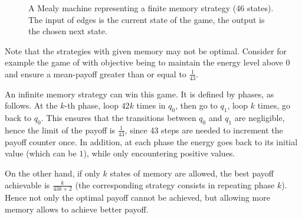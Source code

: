\begin{figure}
\centering
{}
\caption[A Mealy machine representing a finite memory strategy.]{A Mealy machine representing a finite memory strategy (46 states). The input of edges is the current state of the game, the output is the chosen next state.}
\label{tj:fig:memory42}
\end{figure}

\begin{remark}
Note that the strategies with given memory may not be optimal.
Consider for example the game of  with objective being to maintain the energy level above $0$ and ensure a mean-payoff greater than or equal to $\frac1{43}$.

An infinite memory strategy can win this game.
It is defined by phases, as follows.
At the $k$-th phase, loop $42k$ times in $q_0$, then go to $q_1$, loop $k$ times, go back to $q_0$.
This ensures that the transitions between $q_0$ and $q_1$ are negligible, hence the limit of the payoff is $\frac1{43}$, since 43 steps are needed to increment the payoff counter once.
In addition, at each phase the energy goes back to its initial value (which can be $1$), while only encountering positive values.

On the other hand, if only $k$ states of memory are allowed, the best payoff achievable is $\frac{k}{43k+2}$ (the corresponding strategy consists in repeating phase $k$).
Hence not only the optimal payoff cannot be achieved, but allowing more memory allows to achieve better payoff.
\end{remark}

